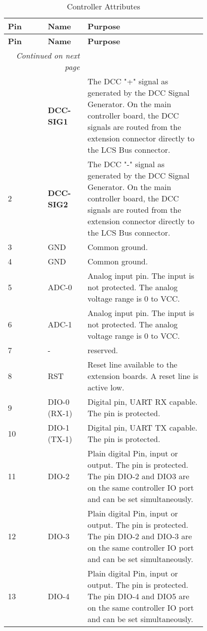 \begin{longtable}{@{}|l|p{0.2\linewidth}p{0.6\linewidth}@{}}
    \caption{Controller Attributes} \\
    \toprule
    \textbf{Pin} & \textbf{Name} & \textbf{Purpose}\\
    \midrule
    \endfirsthead
    \toprule
    \textbf{Pin} & \textbf{Name} & \textbf{Purpose}\\
    \midrule
    \endhead
    \midrule
    \multicolumn{2}{r}{\textit{Continued on next page}} \\
    \midrule
    \endfoot
    \bottomrule
    \endlastfoot
    1 & \textbf{DCC-SIG1} & The DCC "+" signal as generated by the DCC Signal Generator. On the main controller board, the DCC signals are routed from the extension connector directly to the LCS Bus connector. \\
    \midrule
    2 & \textbf{DCC-SIG2} & The DCC "-" signal as generated by the DCC Signal Generator. On the main controller board, the DCC signals are routed from the extension connector directly to the LCS Bus connector. \\
    \midrule
    3 & GND & Common ground. \\
    \midrule
    4 & GND & Common ground. \\
    \midrule
    5 & ADC-0 & Analog input pin. The input is not protected. The analog voltage range is 0 to VCC. \\
    \midrule
    6 & ADC-1 & Analog input pin. The input is not protected. The analog voltage range is 0 to VCC. \\
    \midrule
    7 & - & reserved. \\
    \midrule
    8 & RST & Reset line available to the extension boards. A reset line is active low. \\
    \midrule
    9 & DIO-0 (RX-1) & Digital pin, UART RX capable. The pin is protected. \\
    \midrule
    10 & DIO-1 (TX-1) & Digital pin, UART TX capable. The pin is protected. \\
    \midrule
    11 & DIO-2 & Plain digital Pin, input or output. The pin is protected. The pin DIO-2 and DIO3 are on the same controller IO port and can be set simultaneously. \\
    \midrule
    12 & DIO-3 & Plain digital Pin, input or output. The pin is protected. The pin DIO-2 and DIO-3 are on the same controller IO port and can be set simultaneously. \\
    \midrule
    13 & DIO-4 & Plain digital Pin, input or output. The pin is protected. The pin DIO-4 and DIO5 are on the same controller IO port and can be set simultaneously. \\

\end{longtable}
